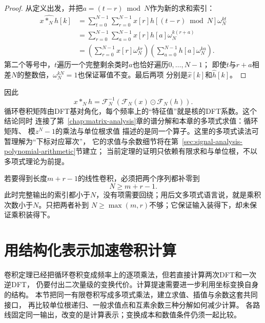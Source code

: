 \begin{proof}
从定义出发，并把$a=(t-r)\bmod N$作为新的求和索引：
\begin{align*}
  \widehat{x*_Nh}[k]
  &=
  \sum_{t=0}^{N-1}
  \sum_{r=0}^{N-1}
  x[r]h[(t-r)\bmod N]\omega_N^{kt}\\
  &=
  \sum_{r=0}^{N-1}
  \sum_{a=0}^{N-1}
  x[r]h[a]\omega_N^{k(r+a)}\\
  &=
  \left(\sum_{r=0}^{N-1}x[r]\omega_N^{kr}\right)
  \left(\sum_{a=0}^{N-1}h[a]\omega_N^{ka}\right).
\end{align*}
第二个等号中，$t$遍历一个完整剩余类时$a$也恰好遍历$0,\ldots,N-1$；
即使$t$与$r+a$相差$N$的整数倍，$\omega_N^{kN}=1$也保证幂值不变。最后两项
分别是$\widehat{x}[k]$和$\widehat{h}[k]$。
\end{proof}

因此
\begin{equation}
  x*_Nh
  =
  \mathcal{F}_N^{-1}
  \left(
    \mathcal{F}_N(x)\odot\mathcal{F}_N(h)
  \right).
  \label{eq:signal-analysis-frequency-domain-convolution}
\end{equation}
循环卷积矩阵由DFT基对角化，每个频率上的“特征值”就是核的DFT系数。这个结论同时
连接了第~\ref{chap:matrix-analysis}章的谱分解和本章的多项式求值：循环矩阵、
模$z^N-1$的乘法与单位根求值
描述的是同一个算子。这里的多项式读法可暂理解为“下标对应幂次”，
它的求值与余数细节将在第~\ref{sec:signal-analysis-polynomial-arithmetic}节建立；
当前定理的证明只依赖有限求和与单位根，不以多项式理论为前提。

若要得到长度$m+r-1$的线性卷积，必须把两个序列都补零到
\begin{equation}
  N\geq m+r-1.
  \label{eq:signal-analysis-linear-padding-condition}
\end{equation}
此时完整输出的索引都小于$N$，没有项需要回绕；用后文多项式语言说，就是乘积次数小于$N$。只把两者补到
$N\geq\max(m,r)$不够；它保证输入装得下，却未保证乘积装得下。

\section{用结构化表示加速卷积计算}
\label{sec:signal-analysis-fast-transforms}

卷积定理已经把循环卷积变成频率上的逐项乘法，但若直接计算两次DFT和一次逆DFT，
仍要付出二次量级的变换代价。计算提速需要进一步利用坐标变换自身的结构。
本节把同一有限卷积写成多项式乘法，建立求值、插值与余数这套共同接口，
再比较单位根递归、一般求值点和互素余数三种分解如何减少计算。
各路线固定同一输出，改变的是计算表示；变换成本和数值条件仍须一起比较。


